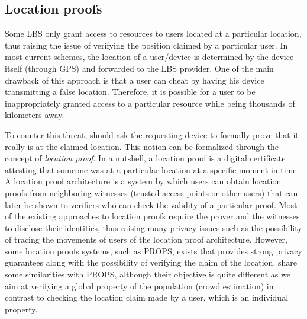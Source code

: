 \subsection{Location proofs}

Some \ac{LBS} only grant access to resources to users located at a particular 
location,  thus raising the issue of verifying the position claimed by a 
particular user. In most current schemes, the location of a user/device is 
determined by the device itself (\eg through GPS) and forwarded to the \ac{LBS} 
provider. One of the main drawback of this approach is that a user can cheat by 
having his device transmitting a false location. Therefore, it is possible for a 
user to be inappropriately granted access to a particular resource while being 
thousands of kilometers away.

To counter this threat,  should ask the requesting device to formally 
prove that it really is at the claimed location. This notion can be formalized 
through the concept of \emph{location proof}. In a nutshell, a location proof is 
a digital certificate attesting that someone was at a particular location at a 
specific moment in time. A location proof architecture is a system by which 
users can obtain location proofs from neighboring witnesses (\eg trusted access 
points or other users) that can later be shown to verifiers who can check the 
validity of a particular proof. Most of the existing approaches to location 
proofs require the prover and the witnesses to disclose their identities, thus 
raising many privacy issues such as the possibility of tracing the movements of 
users of the location proof architecture.
However, some location proofs systems, such as \ac{PROPS}, exists that provides 
strong privacy guarantees along with the possibility of verifying the claim of 
the location. \PRIVO share some similarities with \ac{PROPS}, although their 
objective is quite different as we aim at verifying a global property of the 
population (\ie crowd estimation) in contrast to checking the location claim 
made by a user, which is an individual property. 
